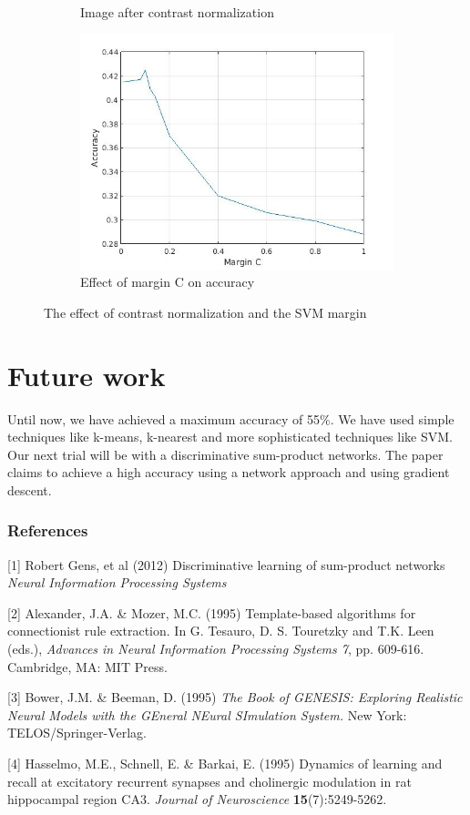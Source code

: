 \documentclass{article} %
\begin{document}
\begin{figure}
\begin{subfigure}{0.33\textwidth}
\caption{Image after contrast normalization}
\end{subfigure}
\begin{subfigure}{0.33\textwidth}
\centering
\includegraphics[scale=0.25]{c-vs-accuracy}
\caption{Effect of margin C on accuracy}
\end{subfigure}
\label{fig:cvsaccuracy}
\caption{The effect of contrast normalization and the SVM margin}
\label{fig:contrast}
\end{figure}

\section{Future work}
    Until now, we have achieved a maximum accuracy of 55\%. We have used simple techniques like k-means, k-nearest and more sophisticated techniques like SVM. Our next trial will be with a discriminative sum-product networks. The paper claims to achieve a high accuracy using a network approach and using gradient descent.

\subsubsection*{References}

\small{
    [1] Robert Gens, et al (2012) Discriminative learning of sum-product networks {\it Neural Information Processing Systems}

[2] Alexander, J.A. \& Mozer, M.C. (1995) Template-based algorithms
for connectionist rule extraction. In G. Tesauro, D. S. Touretzky
and T.K. Leen (eds.), {\it Advances in Neural Information Processing
Systems 7}, pp. 609-616. Cambridge, MA: MIT Press.

[3] Bower, J.M. \& Beeman, D. (1995) {\it The Book of GENESIS: Exploring
Realistic Neural Models with the GEneral NEural SImulation System.}
New York: TELOS/Springer-Verlag.

[4] Hasselmo, M.E., Schnell, E. \& Barkai, E. (1995) Dynamics of learning
and recall at excitatory recurrent synapses and cholinergic modulation
in rat hippocampal region CA3. {\it Journal of Neuroscience}
{\bf 15}(7):5249-5262.
}
\end{document}
